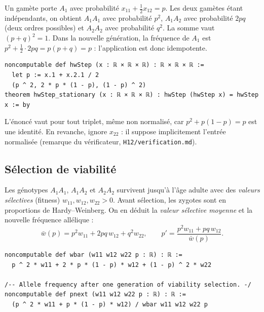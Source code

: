 \begin{humanproof}
Un gamète porte $A_1$ avec probabilité $x_{11}+\frac12x_{12}=p$. Les deux gamètes étant indépendants, on obtient
$A_1A_1$ avec probabilité $p^2$, $A_1A_2$ avec probabilité $2pq$ (deux ordres possibles) et $A_2A_2$ avec
probabilité $q^2$. La somme vaut $(p+q)^2=1$. Dans la nouvelle génération, la fréquence de $A_1$ est
$p^2+\frac12\cdot2pq=p(p+q)=p$ : l'application est donc idempotente.
\end{humanproof}

\begin{leanbox}
\begin{lstlisting}[language=Lean]
noncomputable def hwStep (x : ℝ × ℝ × ℝ) : ℝ × ℝ × ℝ :=
  let p := x.1 + x.2.1 / 2
  (p ^ 2, 2 * p * (1 - p), (1 - p) ^ 2)
theorem hwStep_stationary (x : ℝ × ℝ × ℝ) : hwStep (hwStep x) = hwStep x := by
\end{lstlisting}
L'énoncé  vaut pour tout triplet, même non normalisé, car $p^2+p(1-p)=p$ est une identité.
En revanche,  ignore $x_{22}$ : il suppose implicitement l'entrée normalisée (remarque du
vérificateur, \texttt{H12/verification.md}).
\end{leanbox}

\subsection{Sélection de viabilité}
Les génotypes $A_1A_1$, $A_1A_2$ et $A_2A_2$ survivent jusqu'à l'âge adulte avec des \emph{valeurs sélectives}
(fitness) $w_{11},w_{12},w_{22}>0$. Avant sélection, les zygotes sont en proportions de Hardy--Weinberg. On en
déduit la \emph{valeur sélective moyenne} et la nouvelle fréquence allélique :
\[
\bar w(p)=p^2w_{11}+2pq\,w_{12}+q^2w_{22},\qquad
p'=\frac{p^2w_{11}+pq\,w_{12}}{\bar w(p)}.
\]

\begin{leanbox}
\begin{lstlisting}[language=Lean]
noncomputable def wbar (w11 w12 w22 p : ℝ) : ℝ :=
  p ^ 2 * w11 + 2 * p * (1 - p) * w12 + (1 - p) ^ 2 * w22

/-- Allele frequency after one generation of viability selection. -/
noncomputable def pnext (w11 w12 w22 p : ℝ) : ℝ :=
  (p ^ 2 * w11 + p * (1 - p) * w12) / wbar w11 w12 w22 p
\end{lstlisting}
\end{leanbox}

